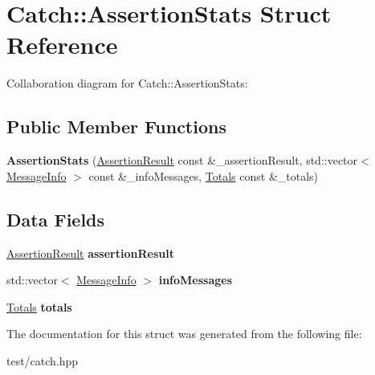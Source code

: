 \hypertarget{structCatch_1_1AssertionStats}{}\section{Catch\+:\+:Assertion\+Stats Struct Reference}
\label{structCatch_1_1AssertionStats}


Collaboration diagram for Catch\+:\+:Assertion\+Stats\+:
\subsection*{Public Member Functions}
\begin{DoxyCompactItemize}
\item 
{\bfseries Assertion\+Stats} (\hyperlink{classCatch_1_1AssertionResult}{Assertion\+Result} const \&\+\_\+assertion\+Result, std\+::vector$<$ \hyperlink{structCatch_1_1MessageInfo}{Message\+Info} $>$ const \&\+\_\+info\+Messages, \hyperlink{structCatch_1_1Totals}{Totals} const \&\+\_\+totals)\hypertarget{structCatch_1_1AssertionStats_a683d4c44ba214b9091cef80f4ee97967}{}\label{structCatch_1_1AssertionStats_a683d4c44ba214b9091cef80f4ee97967}

\end{DoxyCompactItemize}
\subsection*{Data Fields}
\begin{DoxyCompactItemize}
\item 
\hyperlink{classCatch_1_1AssertionResult}{Assertion\+Result} {\bfseries assertion\+Result}\hypertarget{structCatch_1_1AssertionStats_a9f983a85332251f464efb4efba021b89}{}\label{structCatch_1_1AssertionStats_a9f983a85332251f464efb4efba021b89}

\item 
std\+::vector$<$ \hyperlink{structCatch_1_1MessageInfo}{Message\+Info} $>$ {\bfseries info\+Messages}\hypertarget{structCatch_1_1AssertionStats_a12a032fa1f6e0fa8711946625758e6bb}{}\label{structCatch_1_1AssertionStats_a12a032fa1f6e0fa8711946625758e6bb}

\item 
\hyperlink{structCatch_1_1Totals}{Totals} {\bfseries totals}\hypertarget{structCatch_1_1AssertionStats_a1cb537d44b8be3b19663f5fd1c25ce7a}{}\label{structCatch_1_1AssertionStats_a1cb537d44b8be3b19663f5fd1c25ce7a}

\end{DoxyCompactItemize}


The documentation for this struct was generated from the following file\+:\begin{DoxyCompactItemize}
\item 
test/catch.\+hpp\end{DoxyCompactItemize}

